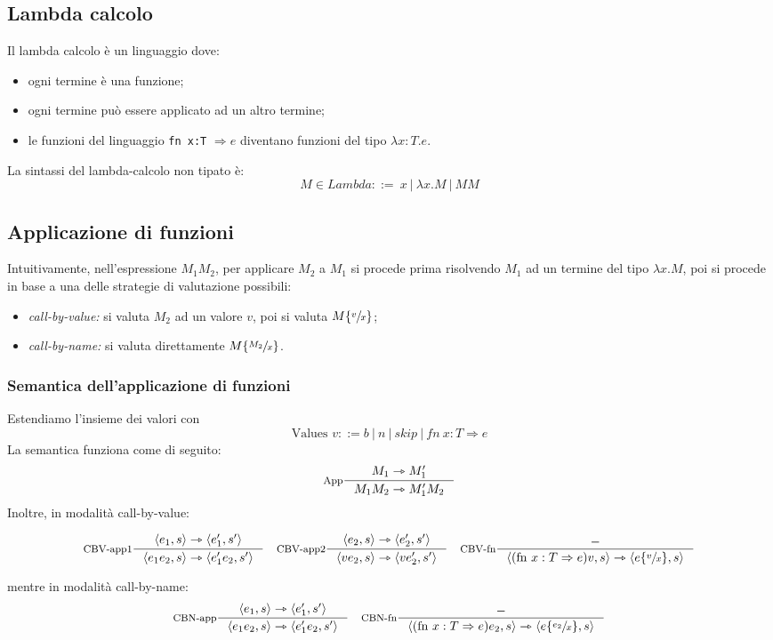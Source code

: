 \documentclass[a4paper, 11pt]{article}
\newcommand{\subs}[3]{#1 \lbrace \sfrac{#2}{#3} \rbrace}
\begin{document}
\subsection{Lambda calcolo}
Il lambda calcolo è un linguaggio dove: \begin{itemize}
	\item ogni termine è una funzione;
	\item ogni termine può essere applicato ad un altro termine;
	\item le funzioni del linguaggio \lstinline|fn x:T| $\Rightarrow e$ diventano funzioni del tipo $\lambda x:T.e$.
\end{itemize}

La sintassi del lambda-calcolo non tipato è: \[ M \in Lambda ::=\ x\ |\ \lambda x.M\ |\ MM \]

\subsection{Applicazione di funzioni}
Intuitivamente, nell'espressione $M_1M_2$, per applicare $M_2$ a $M_1$ si procede prima risolvendo $M_1$ ad un termine del tipo $\lambda x.M$, poi si procede in base a una delle strategie di valutazione possibili: \begin{itemize}
\item \textit{call-by-value:} si valuta $M_2$ ad un valore $v$, poi si valuta $\subs{M}{v}{x}$;
\item \textit{call-by-name:} si valuta direttamente $\subs{M}{M_2}{x}$.
\end{itemize}

\subsubsection{Semantica dell'applicazione di funzioni}
Estendiamo l'insieme dei valori con 
\[ 
	\text{Values } v::= b\ |\ n\ |\ skip\ |\ fn\ x:T \Rightarrow e 
\]
La semantica funziona come di seguito:
\[ \inference[App]{M_1 \rightarrowtriangle M_1'}{M_1M_2 \rightarrowtriangle M_1'M_2} \]
Inoltre, in modalità call-by-value: \begin{adjustwidth}{-1.3cm}{}
\begin{align*}
	\inference[CBV-app1]{\langle e_1, s \rangle \rightarrowtriangle \langle e_1', s' \rangle}{\langle e_1e_2,s \rangle \rightarrowtriangle \langle e_1'e_2, s' \rangle}\quad  \inference[CBV-app2]{\langle e_2,s \rangle \rightarrowtriangle \langle e_2',s' \rangle}{\langle ve_2,s \rangle \rightarrowtriangle \langle ve_2',s' \rangle} \quad
	\inference[CBV-fn]{-}{\langle (\text{fn }x:T \Rightarrow e)v, s \rangle \rightarrowtriangle \langle \subs{e}{v}{x},s \rangle}
\end{align*}
\end{adjustwidth}
mentre in modalità call-by-name: 
\begin{align*}
	\inference[CBN-app]{\langle e_1, s \rangle \rightarrowtriangle \langle e_1', s' \rangle}{\langle e_1e_2,s \rangle \rightarrowtriangle \langle e_1'e_2, s' \rangle} \quad \inference[CBN-fn]{-}{\langle (\text{fn }x:T \Rightarrow e)e_2, s \rangle \rightarrowtriangle \langle \subs{e}{e_2}{x},s \rangle}
\end{align*}
\end{document}
